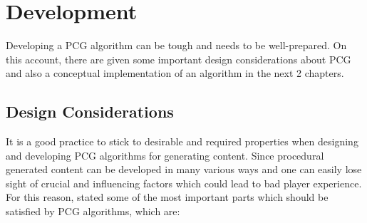 \documentclass[MGS,Master,english]{twbook}%
\begin{document}
\section{Development}
Developing a PCG algorithm can be tough and needs to be well-prepared. On this account, there are given some important design considerations about PCG and also a conceptual implementation of an algorithm in the next 2 chapters.

\subsection{Design Considerations}
It is a good practice to stick to desirable and required properties when designing and developing PCG algorithms for generating content. Since procedural generated content can be developed in many various ways and one can easily lose sight of crucial and influencing factors which could lead to bad player experience. For this reason, \cite{pcg::book} stated some of the most important parts which should be satisfied by PCG algorithms, which are:
\end{document}
